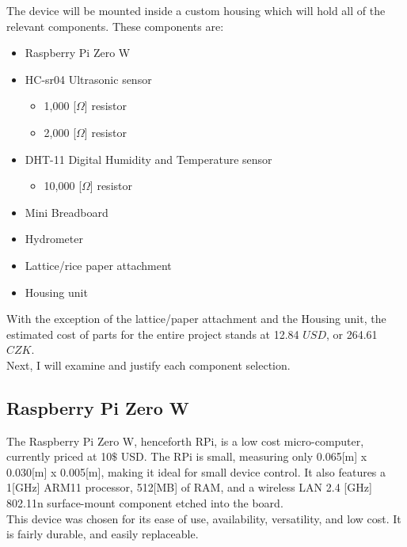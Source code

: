 \documentclass[twoside]{ctuthesis}
\theoremstyle{plain}
\theoremstyle{definition}
\theoremstyle{note}
\begin{document}
The device will be mounted inside a custom housing which will hold all of the relevant components. These components are:

\begin{itemize}
	\item Raspberry Pi Zero W
	\item HC-sr04 Ultrasonic sensor
	\begin{itemize}
		\item 1,000 [$\Omega$] resistor
		\item 2,000 [$\Omega$] resistor
	\end{itemize}
	\item DHT-11 Digital Humidity and Temperature sensor
	\begin{itemize}
		\item 10,000 [$\Omega$] resistor
	\end{itemize}
	\item Mini Breadboard
	\item Hydrometer
	\item Lattice/rice paper attachment
	\item Housing unit
\end{itemize}

With the exception of the lattice/paper attachment and the Housing unit, the estimated cost of parts for the entire project stands at 12.84 $USD$, or 264.61 $CZK$.\\
Next, I will examine and justify each component selection.

\subsection{Raspberry Pi Zero W}
The Raspberry Pi Zero W, henceforth RPi, is a low cost micro-computer, currently priced at 10$\$$ USD. The RPi is small, measuring only 0.065[m] x 0.030[m] x 0.005[m], making it ideal for small device control. It also features a 1[GHz] ARM11 processor, 512[MB] of RAM, and a wireless LAN 2.4 [GHz] 802.11n surface-mount component etched into the board.\\
This device was chosen for its ease of use, availability, versatility, and low cost. It is fairly durable, and easily replaceable.
\end{document}
